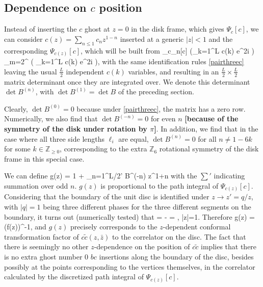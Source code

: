 \documentclass[12pt]{article}
\newcommand{\wt}[1]{\widetilde{#1}}
\newcommand{\fixme}[1]{{\bf {\color{red}[#1]}}}
\begin{document}
\subsection{Dependence on $c$ position}
Instead of inserting the $c$ ghost at $z=0$ in the disk frame, which gives $\Psi_c[c]$, we can consider $c(z) = \sum_{n \leq 1} c_n z^{1-n}$ inserted at a generic $|z|<1$ and the corresponding $\Psi_{c(z)}[c]$, which will be built from
\ie
\Psi_{c_n}[c] \propto \left(\sum_{k=1}^L c(k) e^{2\pi i } \right) \prod_{m=2}^{} \left( \sum_{k=1}^L c(k) e^{2\pi i } \right),
\fe
with the same identification rules \eqref{pairthreec} leaving the usual $\frac{L}{2}$ independent $c(k)$ variables, and resulting in an $\frac{L}{2} \times \frac{L}{2}$ matrix determinant once they are integrated over. We denote this determinant $\det B^{(n)}$, with $\det B^{(1)} = \det B$ of the preceding section.

Clearly, $\det B^{(0)} = 0$ because under \eqref{pairthreec}, the matrix has a zero row. Numerically, we also find that $\det B^{(-n)} = 0$ for even $n$ \fixme{because of the symmetry of the disk under rotation by $\pi$}. In addition, we find that in the case where all three side lengths $\ell_i$ are equal, $\det B^{(n)} = 0$ for all $n \neq 1-6k$ for some $k\in \mathbb{Z}_{\geq 0}$, corresponding to the extra $\mathbb{Z}_6$ rotational symmetry of the disk frame in this special case.

We can define
\ie
g(z) = 1 + \sum_{n=1}^{L/2}{}' \det B^{(-n)} z^{1+n}
\fe
with the $\sum'$ indicating summation over odd $n$. $g(z)$ is proportional to the path integral of $\Psi_{c(z)}[c]$. Considering that the boundary of the unit disc is identified under $z \to z' = q/z$, with $|q|=1$ being three different phases for the three different segments on the boundary, it turns out (numerically tested) that 
\ie
{} =  \quad \Leftrightarrow \quad - = , \qquad\qquad {}  |z|=1.
\fe 
Therefore
\ie
g(z) = (f(z))^{-1},
\fe
and $g(z)$ precisely corresponds to the $z$-dependent conformal transformation factor of $c\wt{c}(z,\bar z)$ to the correlator on the disc. The fact that there is seemingly no other $z$-dependence on the position of $c\wt{c}$ implies that there is no extra ghost number 0 $bc$ insertions along the boundary of the disc, besides possibly at the points corresponding to the vertices themselves, in the correlator calculated by the discretized path integral of $\Psi_{c(z)}[c]$.
\end{document}
